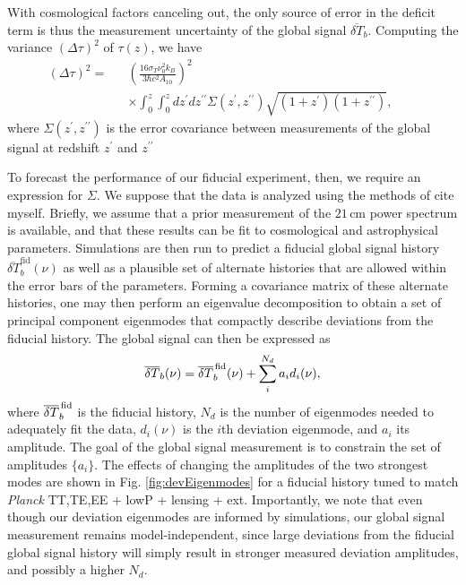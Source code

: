 \documentclass[twocolumn,aps,prd,nofootinbib,showpacs]{revtex4-1}
\begin{document}
With cosmological factors canceling out, the only source of error in the deficit term is thus the measurement uncertainty of the global signal $\overline{\delta T}_b$. Computing the variance $(\Delta \tau)^2$ of $\tau(z)$, we have
\begin{eqnarray}
\label{eq:DeltaTauDoubleIntegral}
(\Delta \tau)^2 = &&\left( \frac{16 \sigma_T \nu_0^2 k_B}{3 \hbar c^2 A_{10}} \right)^2 \nonumber \\
&&\times \int_0^z \! \!\int_0^z dz^\prime dz^{\prime \prime} \Sigma (z^\prime, z^{\prime \prime}) \sqrt{(1+z^\prime) (1+z^{\prime \prime})}, \qquad
\end{eqnarray}
where $\Sigma (z^\prime, z^{\prime \prime})$ is the error covariance between measurements of 
the global signal at redshift $z^\prime$ and $z^{\prime \prime}$

To forecast the performance of our fiducial experiment, then, we require an expression for $\Sigma$. We suppose that the data is analyzed using the methods of \acl{cite myself}. Briefly, we assume that a prior measurement of the $21\,\textrm{cm}$ power spectrum is available, and that these results can be fit to cosmological and astrophysical parameters. Simulations are then run to predict a fiducial global signal history $\overline{\delta T}_b^\textrm{fid} (\nu)$ as well as a plausible set of alternate histories that are allowed within the error bars of the parameters. Forming a covariance matrix of these alternate histories, one may then perform an eigenvalue decomposition to obtain a set of principal component eigenmodes that compactly describe deviations from the fiducial history. The global signal can then be expressed as
\begin{equation}
\overline{\delta T}_b (\nu) = \overline{\delta T}_b^\textrm{\,fid} (\nu) + \sum_i^{N_d} a_i d_i (\nu),
\end{equation}
where $\overline{\delta T}_b^\textrm{\,fid}$ is the fiducial history, $N_d$ is the number of eigenmodes needed to adequately fit the data, $d_i (\nu)$ is the $i$th deviation eigenmode, and $a_i$ its amplitude. The goal of the global signal measurement is to constrain the set of amplitudes $\{ a_i \}$. The effects of changing the amplitudes of the two strongest modes are shown in Fig. \ref{fig:devEigenmodes} for a fiducial history tuned to match \emph{Planck} TT,TE,EE + lowP + lensing + ext. Importantly, we note that even though our deviation eigenmodes are informed by simulations, our global signal measurement remains model-independent, since large deviations from the fiducial global signal history will simply result in stronger measured deviation amplitudes, and possibly a higher $N_d$.
\end{document}
